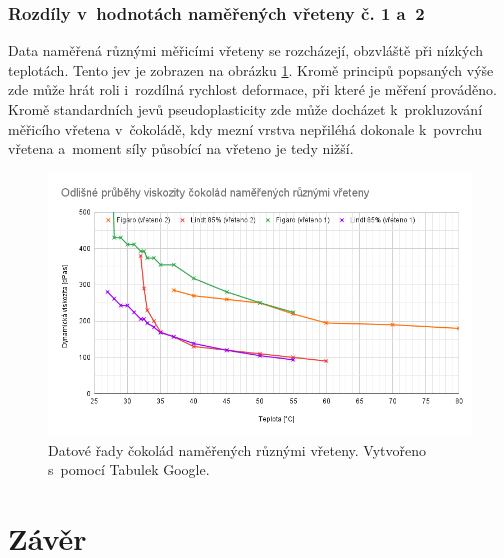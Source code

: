 \documentclass[12pt]{article}
\begin{document}
\subsubsection{Rozdíly v~hodnotách naměřených vřeteny č. 1 a~2}%

Data naměřená různými měřicími vřeteny se rozcházejí, obzvláště při nízkých teplotách. Tento jev je zobrazen na obrázku \ref{fig:ruzna_vretena}. Kromě principů popsaných výše zde může hrát roli i~rozdílná rychlost deformace, při které je měření prováděno. Kromě standardních jevů pseudoplasticity zde může docházet k~prokluzování měřicího vřetena v~čokoládě, kdy mezní vrstva nepřiléhá dokonale k~povrchu vřetena a~moment síly působící na vřeteno je tedy nižší. 

\begin{figure}
    \centering
    \includegraphics[width = \linewidth]{figures/ruzna_vretena.png}
    \caption{Datové řady čokolád naměřených různými vřeteny. Vytvořeno s~pomocí Tabulek Google.}
    \label{fig:ruzna_vretena}
\end{figure}

\newpage%
\section{Závěr}%
\end{document}
